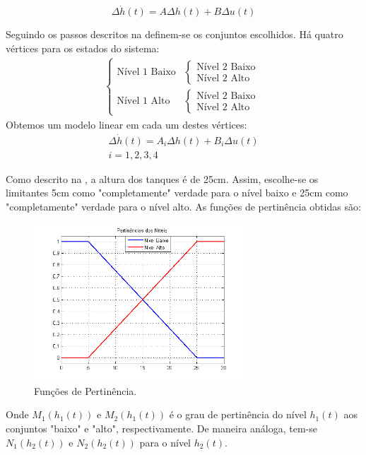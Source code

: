 	\begin{equation}
		\Delta \dot{h}(t) =  A \Delta h(t) +  B \Delta u(t)
	\end{equation}

Seguindo os passos descritos na  definem-se os conjuntos escolhidos. Há quatro vértices para os estados do sistema:
\begin{align}
	\begin{cases}
		\text{Nível 1 Baixo}
		&\begin{cases}
			\text{Nível 2 Baixo}\\
			\text{Nível 2 Alto}
		\end{cases}	\\
		\text{Nível 1 Alto}
		&\begin{cases}
			\text{Nível 2 Baixo}\\
			\text{Nível 2 Alto}
		\end{cases}
	\end{cases}
\end{align}
Obtemos um modelo linear em cada um destes vértices:
	\begin{align}
	\Delta \dot{h}(t) =  A_i \Delta h(t) +  B_i \Delta u(t) \\
	i = 1,2,3,4
	\end{align}


Como descrito na , a altura dos tanques é de 25cm. Assim, escolhe-se os limitantes 5cm como "completamente" verdade para o nível baixo e  25cm como "completamente" verdade para o nível alto. As funções de pertinência obtidas são:
\begin{figure}[H]
	\centering
	\includegraphics[width=0.7\textwidth]{img/pert_niveis.png}
	\caption{\label{figPertMod} Funções de Pertinência.}
\end{figure} 

Onde $M_1(h_1(t))$ e $M_2(h_1(t))$ é o grau de pertinência do nível $h_1(t)$ aos conjuntos "baixo" e "alto", respectivamente. De maneira análoga, tem-se $N_1(h_2(t))$ e $N_2(h_2(t))$ para o nível $h_2(t)$.

